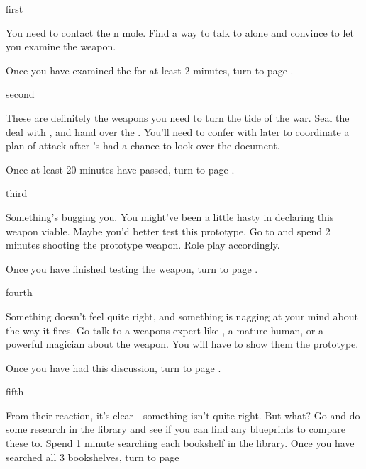 \documentclass[greennotebook]{NeptuneBall}
\begin{document}

\startnotebook{\nIllicitWeapons{}}

\begin{page}{first}

You need to contact the \pAtlantis{}n mole. Find a way to talk to \cGeneral{} alone and convince \cGeneral{\them} to let you examine the weapon.

Once you have examined the \iPrototype{} for at least 2 minutes, turn to page .

\end{page}

\begin{page}{second}

These are definitely the weapons you need to turn the tide of the war. Seal the deal with \cGeneral{}, and hand over the \iBattlePlan{}. You'll need to confer with \cGeneral{\them} later to coordinate a plan of attack after \cGeneral{\they}'s had a chance to look over the document.  

Once at least 20 minutes have passed, turn to page .

\end{page}

\begin{page}{third}

Something's bugging you. You might've been a little hasty in declaring this weapon viable. Maybe you'd better test this prototype. Go to \sGardens{} and spend 2 minutes shooting the prototype weapon. Role play accordingly.

Once you have finished testing the weapon, turn to page .

\end{page}

\begin{page}{fourth}

Something doesn't feel quite right, and something is nagging at your mind about the way it fires. Go talk to a weapons expert like \cPrince{}, a mature human, or a powerful magician about the weapon. You will have to show them the prototype. 

Once you have had this discussion, turn to page .

\end{page}

\begin{page}{fifth}

From their reaction, it's clear - something isn't quite right. But what? Go and do some research in the library and see if you can find any blueprints to compare these to. Spend 1 minute searching each bookshelf in the library. Once you have searched all 3 bookshelves, turn to page 

\end{page}
\end{document}
